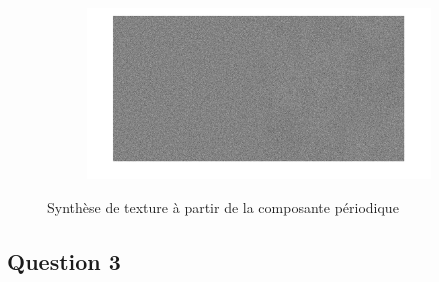 \documentclass[12pt,a4paper,onecolumn]{article}
\begin{document}
\begin{figure}[H]
\begin{subfigure}[b]{\textwidth}
		\label{10_2_tissu}
	\end{subfigure}
	\begin{subfigure}[b]{\textwidth}
		\centering
		\includegraphics[height = 0.20\textheight]{10_2_noise}
		\label{10_2_tissu}
	\end{subfigure}
	\caption{Synthèse de texture à partir de la composante périodique}
	\label{10_2_textures}
\end{figure}


\subsection{Question 3}
\end{document}
